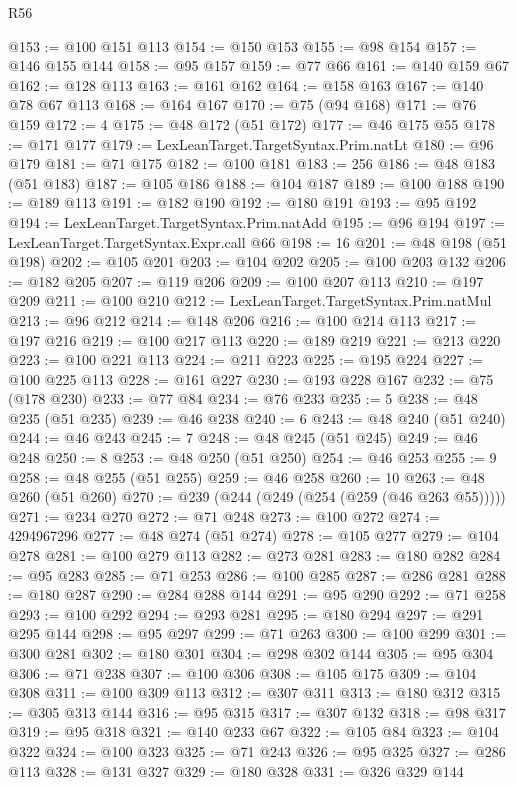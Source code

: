 \begin{lexlean}{R56}
\begin{coremodule}
@153 := @100 @151 @113
@154 := @150 @153
@155 := @98 @154
@157 := @146 @155 @144
@158 := @95 @157
@159 := @77 @66
@161 := @140 @159 @67
@162 := @128 @113
@163 := @161 @162
@164 := @158 @163
@167 := @140 @78 @67 @113
@168 := @164 @167
@170 := @75 (@94 @168)
@171 := @76 @159
@172 := 4
@175 := @48 @172 (@51 @172)
@177 := @46 @175 @55
@178 := @171 @177
@179 := LexLeanTarget.TargetSyntax.Prim.natLt
@180 := @96 @179
@181 := @71 @175
@182 := @100 @181
@183 := 256
@186 := @48 @183 (@51 @183)
@187 := @105 @186
@188 := @104 @187
@189 := @100 @188
@190 := @189 @113
@191 := @182 @190
@192 := @180 @191
@193 := @95 @192
@194 := LexLeanTarget.TargetSyntax.Prim.natAdd
@195 := @96 @194
@197 := LexLeanTarget.TargetSyntax.Expr.call @66
@198 := 16
@201 := @48 @198 (@51 @198)
@202 := @105 @201
@203 := @104 @202
@205 := @100 @203 @132
@206 := @182 @205
@207 := @119 @206
@209 := @100 @207 @113
@210 := @197 @209
@211 := @100 @210
@212 := LexLeanTarget.TargetSyntax.Prim.natMul
@213 := @96 @212
@214 := @148 @206
@216 := @100 @214 @113
@217 := @197 @216
@219 := @100 @217 @113
@220 := @189 @219
@221 := @213 @220
@223 := @100 @221 @113
@224 := @211 @223
@225 := @195 @224
@227 := @100 @225 @113
@228 := @161 @227
@230 := @193 @228 @167
@232 := @75 (@178 @230)
@233 := @77 @84
@234 := @76 @233
@235 := 5
@238 := @48 @235 (@51 @235)
@239 := @46 @238
@240 := 6
@243 := @48 @240 (@51 @240)
@244 := @46 @243
@245 := 7
@248 := @48 @245 (@51 @245)
@249 := @46 @248
@250 := 8
@253 := @48 @250 (@51 @250)
@254 := @46 @253
@255 := 9
@258 := @48 @255 (@51 @255)
@259 := @46 @258
@260 := 10
@263 := @48 @260 (@51 @260)
@270 := @239 (@244 (@249 (@254 (@259 (@46 @263 @55)))))
@271 := @234 @270
@272 := @71 @248
@273 := @100 @272
@274 := 4294967296
@277 := @48 @274 (@51 @274)
@278 := @105 @277
@279 := @104 @278
@281 := @100 @279 @113
@282 := @273 @281
@283 := @180 @282
@284 := @95 @283
@285 := @71 @253
@286 := @100 @285
@287 := @286 @281
@288 := @180 @287
@290 := @284 @288 @144
@291 := @95 @290
@292 := @71 @258
@293 := @100 @292
@294 := @293 @281
@295 := @180 @294
@297 := @291 @295 @144
@298 := @95 @297
@299 := @71 @263
@300 := @100 @299
@301 := @300 @281
@302 := @180 @301
@304 := @298 @302 @144
@305 := @95 @304
@306 := @71 @238
@307 := @100 @306
@308 := @105 @175
@309 := @104 @308
@311 := @100 @309 @113
@312 := @307 @311
@313 := @180 @312
@315 := @305 @313 @144
@316 := @95 @315
@317 := @307 @132
@318 := @98 @317
@319 := @95 @318
@321 := @140 @233 @67
@322 := @105 @84
@323 := @104 @322
@324 := @100 @323
@325 := @71 @243
@326 := @95 @325
@327 := @286 @113
@328 := @131 @327
@329 := @180 @328
@331 := @326 @329 @144

\end{coremodule}
\end{lexlean}
